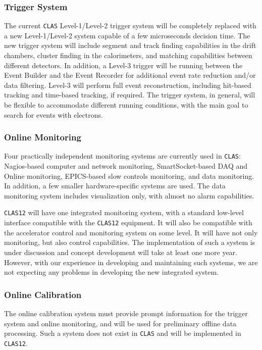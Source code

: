 \subsubsection{Trigger System}

The current {\tt CLAS} Level-1/Level-2 trigger system will be completely 
replaced with a new Level-1/Level-2 system capable of a few microseconds 
decision time.  The new trigger system will include segment and track 
finding capabilities in the drift chambers, cluster finding in the 
calorimeters, and matching capabilities between different detectors.  In
addition, a Level-3 trigger will be running between the Event Builder and 
the Event Recorder for additional event rate reduction and/or data
filtering.  Level-3 will perform full event reconstruction, including
hit-based tracking and time-based tracking, if required.  The trigger system, 
in general, will be flexible to accommodate different running conditions, 
with the main goal to search for events with electrons.

\subsubsection{Online Monitoring}

Four practically independent monitoring systems are currently used in 
{\tt CLAS}: Nagios-based computer and network monitoring, SmartSocket-based 
DAQ and Online monitoring, EPICS-based slow controls monitoring, and data 
monitoring.  In addition, a few smaller hardware-specific systems are used. 
The data monitoring system includes visualization only, with almost no alarm 
capabilities.

{\tt CLAS12} will have one integrated monitoring system, with a standard 
low-level interface compatible with the {\tt CLAS12} equipment.  It will 
also be compatible with the accelerator control and monitoring system on 
some level.  It will have not only monitoring, but also control capabilities. 
The implementation of such a system is under discussion and concept 
development will take at least one more year.  However, with our experience in 
developing and maintaining such systems, we are not expecting any problems in 
developing the new integrated system.

\subsubsection{Online Calibration}

The online calibration system must provide prompt information for the
trigger system and online monitoring, and will be used for preliminary
offline data processing.  Such a system does not exist in {\tt CLAS} and 
will be implemented in {\tt CLAS12}.

